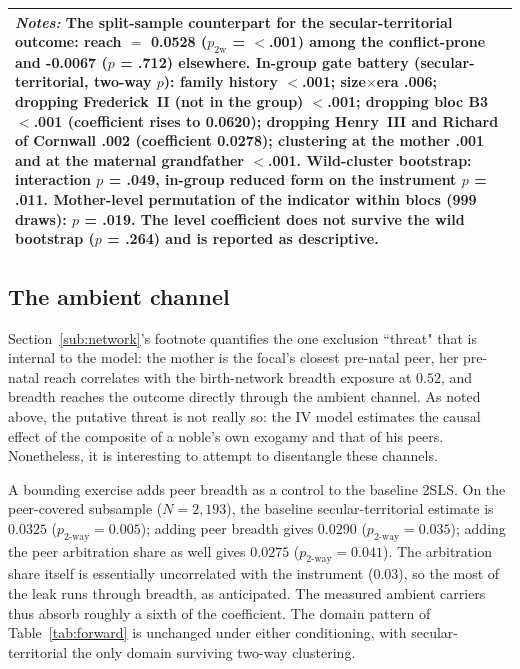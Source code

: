 \documentclass[12pt]{article}
\theoremstyle{definition}
\theoremstyle{remark}
\begin{document}
\begin{table}[t]
\begin{tabular}{lcccccc}
\multicolumn{7}{p{0.94\textwidth}}{\footnotesize \textit{Notes:} The split-sample counterpart for the secular-territorial outcome: reach $=$ 0.0528 ($p_{2\text{w}}$ = $<$.001) among the conflict-prone and -0.0067 ($p$ = .712) elsewhere. In-group gate battery (secular-territorial, two-way $p$): family history $<$.001; size$\times$era .006; dropping Frederick~II (not in the group) $<$.001; dropping bloc B3 $<$.001 (coefficient rises to 0.0620); dropping Henry~III and Richard of Cornwall .002 (coefficient 0.0278); clustering at the mother .001 and at the maternal grandfather $<$.001. Wild-cluster bootstrap: interaction $p$ = .049, in-group reduced form on the instrument $p$ = .011. Mother-level permutation of the indicator within blocs (999 draws): $p$ = .019. The level coefficient does not survive the wild bootstrap ($p$ = .264) and is reported as descriptive.} \\
\bottomrule
\end{tabular}
\end{table}

\subsection{The ambient channel}
\label{app:ambient}

Section~\ref{sub:network}'s footnote quantifies the one exclusion ``threat" that is internal to the model: the mother is the focal's closest pre-natal peer, her pre-natal reach correlates with the birth-network breadth exposure at $0.52$, and breadth reaches the outcome directly through the ambient channel. As noted above, the putative threat is not really so: the IV model estimates the causal effect of the composite of a noble's own exogamy and that of his peers. Nonetheless, it is interesting to attempt to disentangle these channels.

A bounding exercise adds peer breadth as a control to the baseline 2SLS. On the peer-covered subsample ($N = 2{,}193$), the baseline secular-territorial estimate is $0.0325$ ($p_{\text{2-way}} = 0.005$); adding peer breadth gives $0.0290$ ($p_{\text{2-way}} = 0.035$); adding the peer arbitration share as well gives $0.0275$ ($p_{\text{2-way}} = 0.041$). The arbitration share itself is essentially uncorrelated with the instrument ($0.03$), so the most of the leak runs through breadth, as anticipated. The measured ambient carriers thus absorb roughly a sixth of the coefficient. The domain pattern of Table~\ref{tab:forward} is unchanged under either conditioning, with secular-territorial the only domain surviving two-way clustering.
\end{document}

